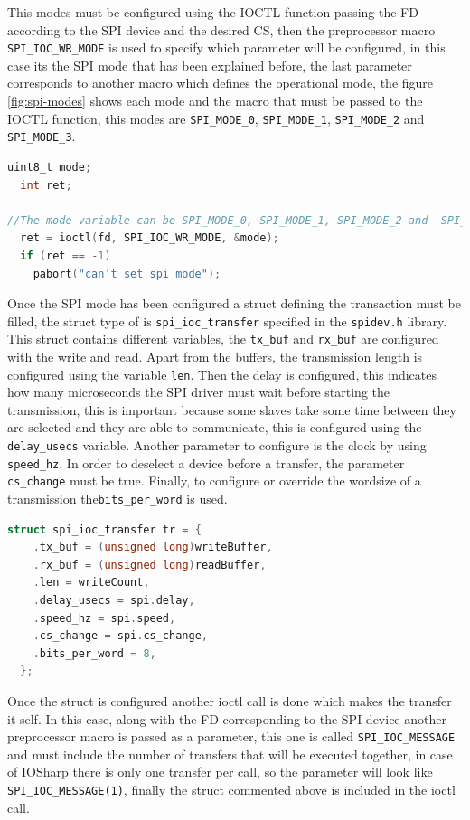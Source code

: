 This modes must be configured using the \gls{IOCTL} function passing the \gls{FD} according to the SPI device and the desired \gls{CS}, then the preprocessor macro \verb!SPI_IOC_WR_MODE! is used to specify which parameter will be configured, in this case its the SPI mode that has been explained before, the last parameter corresponds to another macro which defines the operational mode, the figure \ref{fig:spi-modes} shows each mode and the macro that must be passed to the \gls{IOCTL} function, this modes are \verb!SPI_MODE_0!, \verb!SPI_MODE_1!, \verb!SPI_MODE_2! and \verb!SPI_MODE_3!.

\begin{lstlisting}[language=C, caption={IOSharp.c - SPI Mode configuration}]
uint8_t mode;
  int ret;

//The mode variable can be SPI_MODE_0, SPI_MODE_1, SPI_MODE_2 and  SPI_MODE_3
  ret = ioctl(fd, SPI_IOC_WR_MODE, &mode);
  if (ret == -1)
    pabort("can't set spi mode");
\end{lstlisting}

Once the SPI mode has been configured a struct defining the transaction must be filled, the struct type of is \verb!spi_ioc_transfer! specified in the \verb!spidev.h! library. This struct contains different variables, the \verb!tx_buf! and \verb!rx_buf! are configured with the write and read. Apart from the buffers, the transmission length is configured using the variable \verb!len!. Then the delay is configured, this indicates how many microseconds the SPI driver must wait before starting the transmission, this is important because some slaves take some time between they are selected and they are able to communicate, this is configured using the \verb!delay_usecs! variable. Another parameter to configure is the clock by using \verb!speed_hz!. In order to deselect a device before a transfer, the parameter \verb!cs_change! must be true. Finally, to configure or override the wordsize of a transmission the\verb!bits_per_word! is used.

\begin{lstlisting}[language=C, caption={IOSharp.c - SPI struct configuration}]
struct spi_ioc_transfer tr = {
    .tx_buf = (unsigned long)writeBuffer,
    .rx_buf = (unsigned long)readBuffer,
    .len = writeCount,
    .delay_usecs = spi.delay,
    .speed_hz = spi.speed,
    .cs_change = spi.cs_change,
    .bits_per_word = 8,
  };
\end{lstlisting}

Once the struct is configured another ioctl call is done which makes the transfer it self. In this case, along with the \gls{FD} corresponding to the SPI device another preprocessor macro is passed as a parameter, this one is called \verb!SPI_IOC_MESSAGE! and must include the number of transfers that will be executed together, in case of IOSharp there is only one transfer per call, so the parameter will look like \verb!SPI_IOC_MESSAGE(1)!, finally the struct commented above is included in the ioctl call.

